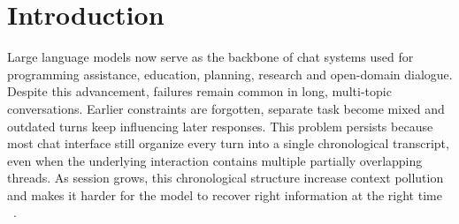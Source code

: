 \documentclass[pdflatex,sn-mathphys-num]{sn-jnl}%
\theoremstyle{thmstyleone}%
\theoremstyle{thmstyletwo}%
\theoremstyle{thmstylethree}%
\begin{document}
\maketitle


\section{Introduction}\label{sec1}







Large language models now serve as the backbone of chat systems used for programming assistance, education, planning, research and open-domain dialogue. Despite this advancement, failures remain common in long, multi-topic conversations. Earlier constraints are forgotten, separate task become mixed and outdated turns keep influencing later responses. This problem persists because most chat interface still organize every turn into a single chronological transcript, even when the underlying interaction contains multiple partially overlapping threads. As session grows, this chronological structure increase context pollution and makes it harder for the model to recover right information at the right time ~\cite{liu2023lostinthemiddle,laban2024limt}.








\end{document}
